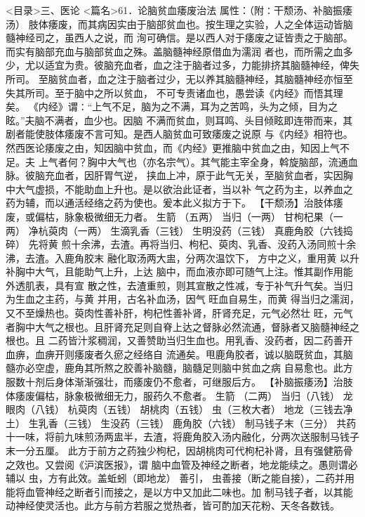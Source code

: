 \documentclass[a4paper,12pt,UTF8,twoside]{ctexbook}
\begin{document}
<目录>三、医论
<篇名>61．论脑贫血痿废治法
属性：（附∶干颓汤、补脑振痿汤） 
肢体痿废，而其病因实由于脑部贫血也。按生理之实验，人之全体运动皆脑髓神经司之，虽西人之说，而 
洵可确信。是以西人对于痿废之证皆责之于脑部。而实有脑部充血与脑部贫血之殊。盖脑髓神经原借血为濡润 
者也，而所需之血多少，尤以适宜为贵。彼脑充血者，血之注于脑者过多，力能排挤其脑髓神经，俾失所司。 
至脑贫血者，血之注于脑者过少，无以养其脑髓神经，其脑髓神经亦恒至失其所司。至于脑中之所以贫血， 
不可专责诸血也，愚尝读《内经》而悟其理矣。 
《内经》谓∶“上气不足，脑为之不满，耳为之苦鸣，头为之倾，目为之眩。”夫脑不满者，血少也。因脑 
不满而贫血，则耳鸣、头目倾眩即连带而来，其剧者能使肢体痿废不言可知。是西人脑贫血可致痿废之说原 
与《内经》相符也。然西医论痿废之由，知因脑中贫血，而《内经》更推脑中贫血之由，知因上气不足。夫 
上气者何？胸中大气也（亦名宗气）。其气能主宰全身，斡旋脑部，流通血脉。彼脑充血者，因肝胃气逆， 
挟血上冲，原于此气无关，至脑贫血者，实因胸中大气虚损，不能助血上升也。是以欲治此证者，当以补 
气之药为主，以养血之药为辅，而以通活经络之药为使也。爰本此义拟方于下。 
【干颓汤】治肢体痿废，或偏枯，脉象极微细无力者。 
生箭 （五两） 当归（一两） 甘枸杞果（一两） 净杭萸肉（一两） 
生滴乳香（三钱） 生明没药（三钱） 真鹿角胶（六钱捣碎） 
先将黄 煎十余沸，去渣。再将当归、枸杞、萸肉、乳香、没药入汤同煎十余沸，去渣。入鹿角胶末 
融化取汤两大盅，分两次温饮下， 
方中之义，重用黄 以升补胸中大气，且能助气上升，上达 
脑中，而血液亦即可随气上注。惟其副作用能外透肌表，具有宣 
散之性，去渣重煎，则其宣散之性减，专于补气升气矣。当归为生血之主药，与黄 并用，古名补血汤，因气 
旺血自易生，而黄 得当归之濡润，又不至燥热也。萸肉性善补肝，枸杞性善补肾，肝肾充足，元气必然壮 
旺，元气者胸中大气之根也。且肝肾充足则自脊上达之督脉必然流通，督脉者又脑髓神经之根也。且 
二药皆汁浆稠润，又善赞助当归生血也。用乳香、没药者，因二药善开血痹，血痹开则痿废者久瘀之经络自 
流通矣。甩鹿角胶者，诚以脑既贫血，其脑髓亦必空虚，鹿角其所熬之胶善补脑髓，脑髓足则脑中贫血之病 
自易愈也。此方服数十剂后身体渐渐强壮，而痿废仍不愈者，可继服后方。 
【补脑振痿汤】治肢体痿废偏枯，脉象极微细无力，服药久不愈者。 
生箭 （二两） 当归（八钱） 龙眼肉（八钱） 杭萸肉（五钱） 
胡桃肉（五钱） 虫（三枚大者） 地龙（三钱去净土） 生乳香（三钱） 
生没药（三钱） 鹿角胶（六钱） 制马钱子末（三分） 
共药十一味，将前九味煎汤两盅半，去渣，将鹿角胶入汤内融化，分两次送服制马钱子末一分五厘。 
此方于前方之药独少枸杞，因胡桃肉可代枸杞补肾，且有强健筋骨之效也。又尝阅《沪滨医报》，谓 
脑中血管及神经之断者，地龙能续之。愚则谓必辅以 虫，方有此效。盖蚯蚓（即地龙） 
善引， 虫善接（断之能自接），二药并用能将血管神经之断者引而接之，是以方中又加此二味也。加 
制马钱子者，以其能 动神经使灵活也。此方与前方若服之觉热者，皆可酌加天花粉、天冬各数钱。 
\end{document}
